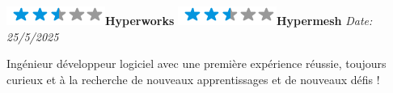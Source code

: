\documentclass[]{friggeri-cv}
\begin{document}
\begin{aside}
\includegraphics[scale=0.40]{res/img/2-5stars.png}\hspace{1.5mm}\textbf{Hyperworks}
\includegraphics[scale=0.40]{res/img/2-5stars.png}\hspace{1.5mm}\textbf{Hypermesh}
\vspace{2.5mm}%
	\emph{Date: 25/5/2025} \hspace*{8mm}
\end{aside}

\vspace*{-2.0mm}
\noindent\parbox{\linewidth}{
  \centering
  Ingénieur développeur logiciel avec une première expérience réussie, toujours curieux et à la recherche de nouveaux apprentissages et de nouveaux défis !
}
\vspace*{0.8mm}
\end{document}
